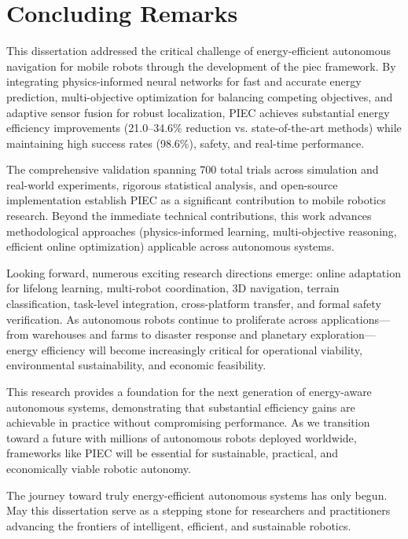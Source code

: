\section{Concluding Remarks}
\label{sec:concluding_remarks}

This dissertation addressed the critical challenge of energy-efficient autonomous navigation for mobile robots through the development of the \acrfull{piec} framework. By integrating physics-informed neural networks for fast and accurate energy prediction, multi-objective optimization for balancing competing objectives, and adaptive sensor fusion for robust localization, PIEC achieves substantial energy efficiency improvements (21.0--34.6\% reduction vs. state-of-the-art methods) while maintaining high success rates (98.6\%), safety, and real-time performance.

The comprehensive validation spanning 700 total trials across simulation and real-world experiments, rigorous statistical analysis, and open-source implementation establish PIEC as a significant contribution to mobile robotics research. Beyond the immediate technical contributions, this work advances methodological approaches (physics-informed learning, multi-objective reasoning, efficient online optimization) applicable across autonomous systems.

Looking forward, numerous exciting research directions emerge: online adaptation for lifelong learning, multi-robot coordination, 3D navigation, terrain classification, task-level integration, cross-platform transfer, and formal safety verification. As autonomous robots continue to proliferate across applications—from warehouses and farms to disaster response and planetary exploration—energy efficiency will become increasingly critical for operational viability, environmental sustainability, and economic feasibility.

This research provides a foundation for the next generation of energy-aware autonomous systems, demonstrating that substantial efficiency gains are achievable in practice without compromising performance. As we transition toward a future with millions of autonomous robots deployed worldwide, frameworks like PIEC will be essential for sustainable, practical, and economically viable robotic autonomy.

The journey toward truly energy-efficient autonomous systems has only begun. May this dissertation serve as a stepping stone for researchers and practitioners advancing the frontiers of intelligent, efficient, and sustainable robotics.
